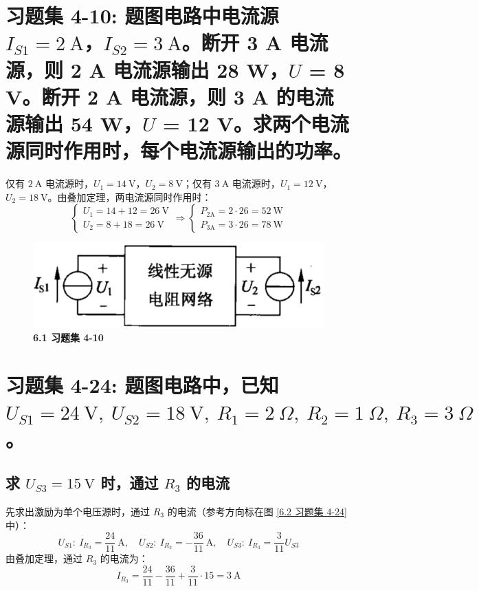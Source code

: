 \documentclass[UTF8]{report}
\theoremstyle{MyLineTheoremStyle} %
\theoremstyle{MyBlockTheoremStyle} %
\theoremstyle{MySubsubsectionStyle} %
\begin{document}
\section{习题集 4-10: 题图电路中电流源 $I_{S1} = 2 \ \mathrm{A}$，$I_{S2}= 3 \ \mathrm{A}$。断开 3 A 电流源，则 2 A 电流源输出 28 W，$U$ = 8 V。断开 2 A 电流源，则 3 A 的电流源输出 54 W，$U$ = 12 V。求两个电流源同时作用时，每个电流源输出的功率。}

仅有 $2 \ \mathrm{A}$ 电流源时，$U_1 = 14 \ \mathrm{V}$，$U_2 = 8 \ \mathrm{V}$；仅有 $3 \ \mathrm{A}$ 电流源时，$U_1 = 12 \ \mathrm{V}$，$U_2 = 18 \ \mathrm{V}$。由叠加定理，两电流源同时作用时：
\begin{equation}
\begin{cases}
    U_1 = 14 + 12 = 26 \ \mathrm{V} \\ 
    U_2 = 8 + 18 = 26 \ \mathrm{V}
\end{cases}
\Longrightarrow 
\boxed{
    \begin{cases}
        P_{2\mathrm{A}} = 2 \cdot 26 = 52 \ \mathrm{W} \\ 
        P_{3\mathrm{A}} = 3 \cdot 26 = 78 \ \mathrm{W}
    \end{cases}
}
\end{equation}
\begin{figure}[H]\centering
\includegraphics[width=0.4\columnwidth]{assets/6/9506aa8f7aeba32072fee006fa1076c7.png}
\caption{\bfseries 6.1 习题集 4-10}\label{6.1 习题集 4-10}
\end{figure}

\section{习题集 4-24: 题图电路中，已知 $U_{S1} = 24 \ \mathrm{V},\  U_{S2} = 18 \ \mathrm{V},\ R_1 = 2 \ \Omega,\ R_2 = 1 \ \Omega,\ R_3 = 3 \ \Omega$。}

\subsection{求 $U_{S3} = 15 \ \mathrm{V}$ 时，通过 $R_3$ 的电流}

先求出激励为单个电压源时，通过 $R_3$ 的电流（参考方向标在图 \ref{6.2 习题集 4-24} 中）：
\begin{equation}
U_{S1}:\ I_{R_3} = \frac{24}{11} \ \mathrm{A} ,\quad U_{S2}:\ I_{R_3} = -\frac{36}{11} \ \mathrm{A},\quad U_{S3}:\ I_{R_3} = \frac{3}{11} U_{S3}
\end{equation}
由叠加定理，通过 $R_3$ 的电流为：
\begin{equation}
\boxed{
    I_{R_3} = \frac{24}{11} - \frac{36}{11} + \frac{3}{11} \cdot 15 = 3 \ \mathrm{A}
}
\end{equation}
\end{document}
